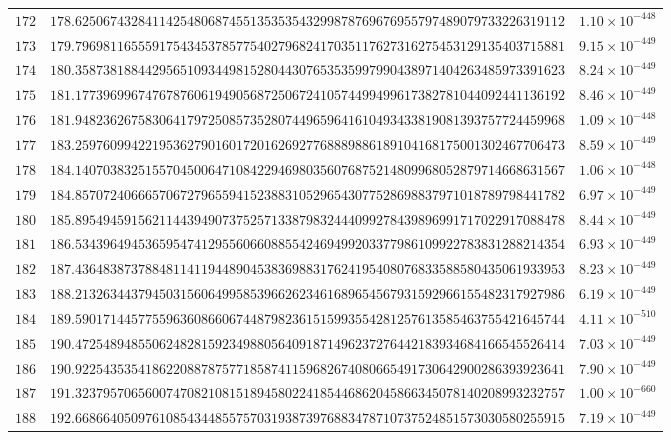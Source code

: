 \documentclass[12pt,reqno]{amsart}
\theoremstyle{remark}
\begin{document}
\begin{longtable}{clc}
$172$ & $178.6250674328411425480687455135353543299878769676955797489079733226319112$ & $1.10\times 10^{-448}$ \\
$173$ & $179.7969811655591754345378577540279682417035117627316275453129135403715881$ & $9.15\times 10^{-449}$ \\
$174$ & $180.3587381884429565109344981528044307653535997990438971404263485973391623$ & $8.24\times 10^{-449}$ \\
$175$ & $181.1773969967476787606194905687250672410574499499617382781044092441136192$ & $8.46\times 10^{-449}$ \\
$176$ & $181.9482362675830641797250857352807449659641610493433819081393757724459968$ & $1.09\times 10^{-448}$ \\
$177$ & $183.2597609942219536279016017201626927768889886189104168175001302467706473$ & $8.59\times 10^{-449}$ \\
$178$ & $184.1407038325155704500647108422946980356076875214809968052879714668631567$ & $1.06\times 10^{-448}$ \\
$179$ & $184.8570724066657067279655941523883105296543077528698837971018789798441782$ & $6.97\times 10^{-449}$ \\
$180$ & $185.8954945915621144394907375257133879832444099278439896991717022917088478$ & $8.44\times 10^{-449}$ \\
$181$ & $186.5343964945365954741295560660885542469499203377986109922783831288214354$ & $6.93\times 10^{-449}$ \\
$182$ & $187.4364838737884811411944890453836988317624195408076833588580435061933953$ & $8.23\times 10^{-449}$ \\
$183$ & $188.2132634437945031560649958539662623461689654567931592966155482317927986$ & $6.19\times 10^{-449}$ \\
$184$ & $189.5901714457755963608660674487982361515993554281257613585463755421645744$ & $4.11\times 10^{-510}$ \\
$185$ & $190.4725489485506248281592349880564091871496237276442183934684166545526414$ & $7.03\times 10^{-449}$ \\
$186$ & $190.9225435354186220887875771858741159682674080665491730642900286393923641$ & $7.90\times 10^{-449}$ \\
$187$ & $191.3237957065600747082108151894580224185446862045866345078140208993232757$ & $1.00\times 10^{-660}$ \\
$188$ & $192.6686640509761085434485575703193873976883478710737524851573030580255915$ & $7.19\times 10^{-449}$ \\

\end{longtable}
\end{document}
